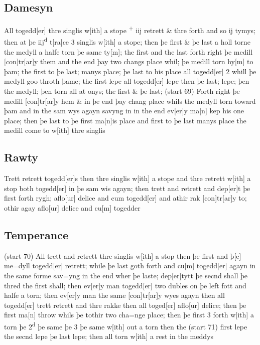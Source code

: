 \documentclass[12pt,letter]{article} %
\newcommand{\srcpg}[1]{(start #1)}
\begin{document}
\subsection{Damesyn}
All togedd{[}er{]} thre singlis w{[}ith{]} a stope \textsuperscript{+}
iij retrett \& thre forth and so ij tymys; then at þe
\reversemarginpar{}iij\textsuperscript{d} t{[}ra{]}ce 3 singlis w{[}ith{]} a stope; then þe
first \& þe last a holl torne the medyll a halfe torn þe same ty{[}m{]};
the first and the last forth right þe medill {[}con{]}tr{[}ar{]}y them
and the end þay two changs place whil; þe medill torn hy{[}m{]} to þam;
the first to þe last; manys place; þe last to his place all
togedd{[}er{]} 2 whill þe medyll goo throth þame; the first lepe all
togedd{[}er{]} lepe then þe last; lepe; þen the medyll; þen torn all at
onys; the first \& þe last; \srcpg{69} Forth right þe medill
{[}con{]}tr{[}ar{]}y hem \& in þe end þay chang place whils the medyll
torn toward þam and in the sam wys agayn savyng in in the end
ev{[}er{]}y ma{[}n{]} kep his one place; then þe last to þe first
ma{[}n{]}is place and first to þe last manys place the medill come to
w{[}ith{]} thre singlis

\subsection{Rawty}
Trett retrett togedd{[}er{]}s then thre singlis w{[}ith{]} a stope and
thre retrett w{[}ith{]} a stop both togedd{[}er{]} in þe sam wis agayn;
then trett and retrett and dep{[}er{]}t þe first forth rygh;
aflo{[}ur{]} delice and cum togedd{[}er{]} and athir rak
{[}con{]}tr{[}ar{]}y to; othir agay aflo{[}ur{]} delice and cu{[}m{]}
togedder

\subsection{Temperance}
\srcpg{70} All trett and retrett thre singlis w{[}ith{]} a stop then þe
first and þ{[}e{]} me=dyll togedd{[}er{]} retrett; while þe last goth
forth and cu{[}m{]} togedd{[}er{]} agayn in the same forme sav=yng in
the end wher þe laste; dep{[}er{]}tytt þe secnd shall þe thred the first
shall; then ev{[}er{]}y man togedd{[}er{]} two dubles on þe left fott
and halfe a torn; then ev{[}er{]}y man the same {[}con{]}tr{[}ar{]}y
wyes agayn then all togedd{[}er{]} trett retrett and thre rakke then all
toged{[}er{]} aflo{[}ur{]} delice; then þe first ma{[}n{]} throw whils
þe tothir two cha=nge place; then þe first 3 forth w{[}ith{]} a torn þe
2\textsuperscript{d} þe same þe 3 þe same w{[}ith{]} out a torn then the
\srcpg{71} first lepe the secnd lepe þe last lepe; then all torn
w{[}ith{]} a rest in the meddys
\end{document}
